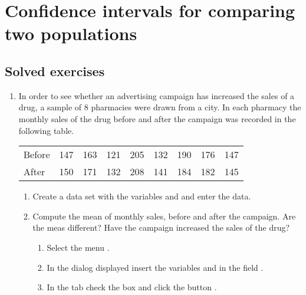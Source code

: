 
\chapter{Confidence intervals for comparing two populations}\label{cha:confidence-intervals-2}

\section{Solved exercises}
\begin{enumerate}[leftmargin=*] 
\item  In order to see whether an advertising campaign has increased the sales of a drug, a sample of 8 pharmacies were
drawn from a city.
In each pharmacy the monthly sales of the drug before and after the campaign was recorded in the following table.
\begin{center}
\begin{tabular}{lrrrrrrrr}
\toprule
Before & 147 & 163 & 121 & 205 & 132 & 190 & 176 & 147 \\
After & 150 & 171 & 132 & 208 & 141 & 184 & 182 & 145\\ 
\bottomrule
\end{tabular}
\end{center}

\begin{enumerate}
\item Create a data set with the variables  and  and enter the data.

\item Compute the mean of monthly sales, before and after the campaign. 
Are the meas different?
Have the campaign increased the sales of the drug?
\begin{indication}
\begin{enumerate}
\item Select the menu .
\item In the dialog displayed insert the variables  and  in the field
.
\item In the  tab check the box  and click the button .
\end{enumerate}
\end{indication}


\end{enumerate}
\end{enumerate}
